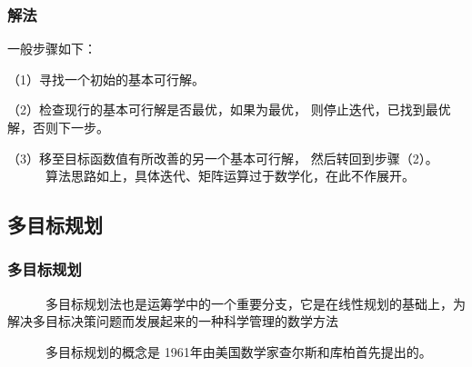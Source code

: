 \documentclass[slidestop,compress,mathserif,c]{beamer}
\begin{document}
\begin{frame}
\frametitle{解法}
一般步骤如下：

（1）寻找一个初始的基本可行解。

（2）检查现行的基本可行解是否最优，如果为最优，
则停止迭代，已找到最优解，否则下一步。

（3）移至目标函数值有所改善的另一个基本可行解，
然后转回到步骤（2）。
\\[1cm]

~~~~~~算法思路如上，具体迭代、矩阵运算过于数学化，在此不作展开。
\end{frame}


%
%
%  
%


\subsection{\hfill 多目标规划}
\begin{frame}
\frametitle{多目标规划}
~~~~~~多目标规划法也是运筹学中的一个重要分支，它是在线性规划的基础上，为解决多目标决策问题而发展起来的一种科学管理的数学方法

~~~~~~多目标规划的概念是 1961年由美国数学家查尔斯和库柏首先提出的。
\end{frame}
\end{document}
